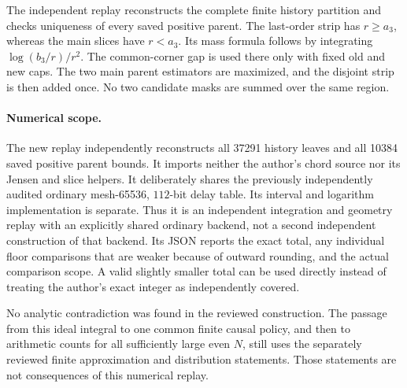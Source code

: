 The independent replay reconstructs the complete finite history
partition and checks uniqueness of every saved positive parent.
The last-order strip has $r\ge a_3$, whereas the main slices
have $r<a_3$. Its mass formula follows by integrating
$\log(b_3/r)/r^2$. The common-corner gap is used there only
with fixed old and new caps. The two main parent estimators
are maximized, and the disjoint strip is then added once.
No two candidate masks are summed over the same region.

\paragraph{Numerical scope.}
The new replay independently reconstructs all 37291 history
leaves and all 10384 saved positive parent bounds. It imports
neither the author's chord source nor its Jensen and slice
helpers. It deliberately shares the previously independently
audited ordinary mesh-65536, $112$-bit delay table. Its interval
and logarithm implementation is separate. Thus it is an
independent integration and geometry replay with an explicitly
shared ordinary backend, not a second independent construction
of that backend. Its JSON reports the exact total, any individual
floor comparisons that are weaker because of outward rounding,
and the actual comparison scope. A valid slightly smaller total
can be used directly instead of treating the author's exact
integer as independently covered.

No analytic contradiction was found in the reviewed construction.
The passage from this ideal integral to one common finite causal
policy, and then to arithmetic counts for all sufficiently large
even $N$, still uses the separately reviewed finite approximation
and distribution statements. Those statements are not consequences
of this numerical replay.
